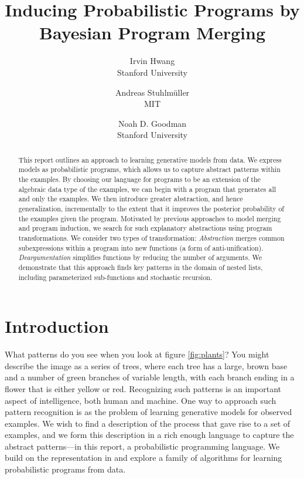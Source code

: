 \documentclass[a4paper,10pt]{article}
\begin{document}
\title{Inducing Probabilistic Programs by Bayesian Program Merging}
\author{Irvin Hwang\\Stanford University  \and Andreas Stuhlm\"{u}ller\\MIT \and Noah D. Goodman\\Stanford University}
\date{}
\maketitle
\thispagestyle{empty}
\begin{abstract}

This report outlines an approach to learning generative models from data. We express models as probabilistic programs, which allows us to capture abstract patterns within the examples. By choosing our language for programs to be an extension of the algebraic data type of the examples, we can begin with a program that generates all and only the examples. We then introduce greater abstraction, and hence generalization, incrementally to the extent that it improves the posterior probability of the examples given the program. Motivated by previous approaches to model merging and program induction, we search for such explanatory abstractions using program transformations. We consider two types of transformation: {\em Abstraction} merges common subexpressions within a program into new functions (a form of anti-unification). {\em Deargumentation} simplifies functions by reducing the number of arguments. We demonstrate that this approach finds key patterns in the domain of nested lists, including parameterized sub-functions and stochastic recursion.

\end{abstract}

\tableofcontents

\section{Introduction}

What patterns do you see when you look at figure \ref{fig:plants}? You might describe the image as a series of trees, where each tree has a large, brown base and a number of green branches of variable length, with each branch ending in a flower that is either yellow or red. Recognizing such patterns is an important aspect of intelligence, both human and machine.
One way to approach such pattern recognition is as the problem of learning generative models for observed examples. We wish to find a description of the process that gave rise to a set of examples, and we form this description in a rich enough language to capture the abstract patterns---in this report, a probabilistic programming language. 
We build on the representation in \cite{A.Stuhlmueller:2010:6d11a} and explore a family of algorithms for learning probabilistic programs from data.
\end{document}
